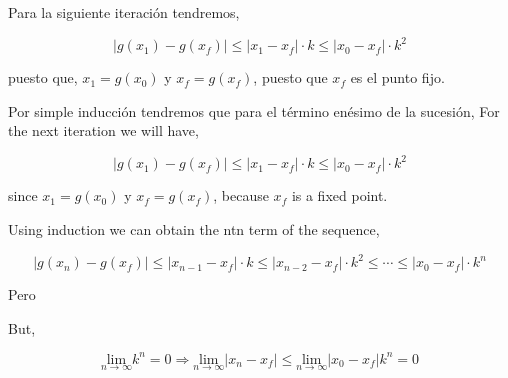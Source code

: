 \begin{paracol}{2}
\switchcolumn
Para la siguiente iteración tendremos,

\begin{equation*}
\vert g(x_1)-g(x_f) \vert \leq \vert x_1-x_f \vert \cdot k \leq \vert x_0-x_f \vert \cdot k^2 
\end{equation*}

puesto que,  $x_1=g(x_0)$ y $x_f = g(x_f)$, puesto que $x_f$ es el punto fijo. 

Por simple inducción tendremos que para el término enésimo de la sucesión,
\switchcolumn
For the next iteration we will have,

\begin{equation*}
\vert g(x_1)-g(x_f) \vert \leq \vert x_1-x_f \vert \cdot k \leq \vert x_0-x_f \vert \cdot k^2 
\end{equation*}

since $x_1=g(x_0)$ y $x_f = g(x_f)$, because $x_f$ is a fixed point.

Using induction we can obtain the ntn term of the sequence,
\end{paracol}
\begin{equation*}
\vert g(x_n)-g(x_f) \vert \leq \vert x_{n-1}-x_f \vert \cdot k \leq \vert x_{n-2}-x_f \vert \cdot k^2 \leq \cdots \leq  \vert x_0-x_f \vert \cdot k^n 
\end{equation*}

\begin{paracol}{2}
Pero

\switchcolumn
But,
\end{paracol}

\begin{equation*}
\underset{n\rightarrow \infty}{\text{lim}}k^n=0 \Rightarrow \underset{n\rightarrow \infty}{\text{lim}} \vert x_n-x_f \vert \leq \underset{n\rightarrow \infty}{\text{lim}}\vert x_0-x_f \vert k^n =0
\end{equation*} 

